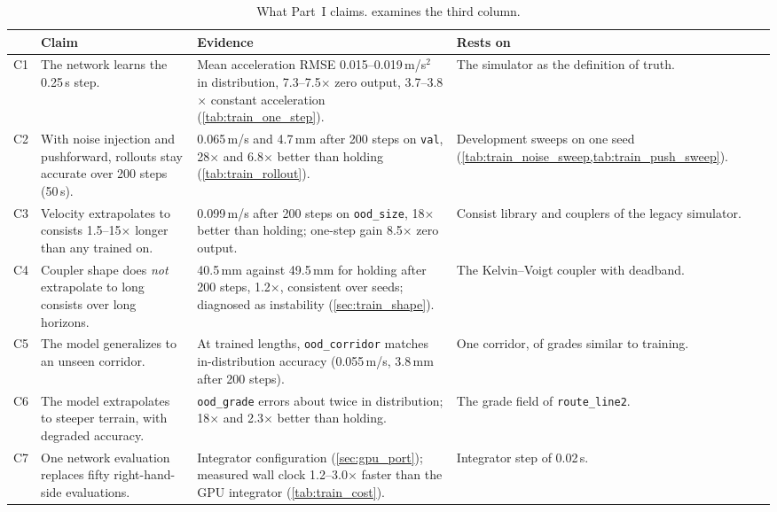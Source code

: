 \begin{table}[htbp]
    \centering
    \small
    \begin{tabular}{>{\raggedright}p{0.6cm}>{\raggedright}p{4.6cm}>{\raggedright}p{4.4cm}>{\raggedright\arraybackslash}p{3.4cm}}
        \toprule
        & Claim & Evidence & Rests on \\
        \midrule
        C1 & The network learns the 0.25\,s step. & Mean acceleration RMSE 0.015--0.019\,m/s$^2$ in distribution, 7.3--7.5$\times$ zero output, 3.7--3.8$\times$ constant acceleration (\cref{tab:train_one_step}). & The simulator as the definition of truth. \\
        C2 & With noise injection and pushforward, rollouts stay accurate over 200 steps (50\,s). & 0.065\,m/s and 4.7\,mm after 200 steps on \texttt{val}, 28$\times$ and 6.8$\times$ better than holding (\cref{tab:train_rollout}). & Development sweeps on one seed (\cref{tab:train_noise_sweep,tab:train_push_sweep}). \\
        C3 & Velocity extrapolates to consists 1.5--15$\times$ longer than any trained on. & 0.099\,m/s after 200 steps on \texttt{ood\_size}, 18$\times$ better than holding; one-step gain 8.5$\times$ zero output. & Consist library and couplers of the legacy simulator. \\
        C4 & Coupler shape does \emph{not} extrapolate to long consists over long horizons. & 40.5\,mm against 49.5\,mm for holding after 200 steps, 1.2$\times$, consistent over seeds; diagnosed as instability (\cref{sec:train_shape}). & The Kelvin--Voigt coupler with deadband. \\
        C5 & The model generalizes to an unseen corridor. & At trained lengths, \texttt{ood\_corridor} matches in-distribution accuracy (0.055\,m/s, 3.8\,mm after 200 steps). & One corridor, of grades similar to training. \\
        C6 & The model extrapolates to steeper terrain, with degraded accuracy. & \texttt{ood\_grade} errors about twice in distribution; 18$\times$ and 2.3$\times$ better than holding. & The grade field of \texttt{route\_line2}. \\
        C7 & One network evaluation replaces fifty right-hand-side evaluations. & Integrator configuration (\cref{sec:gpu_port}); measured wall clock 1.2--3.0$\times$ faster than the GPU integrator (\cref{tab:train_cost}). & Integrator step of 0.02\,s. \\
        \bottomrule
    \end{tabular}
    \caption{What Part~I claims.  examines the third column.}
    \label{tab:train_claims}
\end{table}

